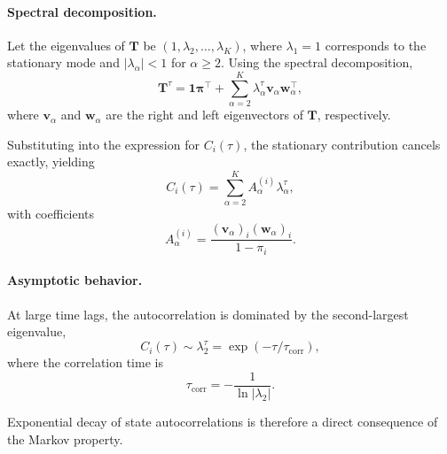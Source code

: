 \documentclass[11pt]{article}
\begin{document}
\paragraph{Spectral decomposition.}
Let the eigenvalues of $\mathbf{T}$ be $(1,\lambda_2,\dots,\lambda_K)$, where
$\lambda_1=1$ corresponds to the stationary mode and
$|\lambda_\alpha|<1$ for $\alpha\ge2$.
Using the spectral decomposition,
\begin{equation}
    \mathbf{T}^\tau
    =
    \mathbf{1}\boldsymbol{\pi}^\top
    + \sum_{\alpha=2}^K \lambda_\alpha^\tau
    \mathbf{v}_\alpha \mathbf{w}_\alpha^\top,
\end{equation}
where $\mathbf{v}_\alpha$ and $\mathbf{w}_\alpha$ are the right and left
eigenvectors of $\mathbf{T}$, respectively.

Substituting into the expression for $C_i(\tau)$, the stationary contribution
cancels exactly, yielding
\begin{equation}
    C_i(\tau)
    =
    \sum_{\alpha=2}^K
    A_\alpha^{(i)} \lambda_\alpha^\tau,
\end{equation}
with coefficients
\begin{equation}
    A_\alpha^{(i)}
    =
    \frac{
        (\mathbf{v}_\alpha)_i (\mathbf{w}_\alpha)_i
    }{
        1-\pi_i
    }.
\end{equation}

\paragraph{Asymptotic behavior.}
At large time lags, the autocorrelation is dominated by the second-largest
eigenvalue,
\begin{equation}
    C_i(\tau) \sim \lambda_2^\tau
    =
    \exp\!\left(-\tau / \tau_{\mathrm{corr}}\right),
\end{equation}
where the correlation time is
\begin{equation}
    \tau_{\mathrm{corr}} = -\frac{1}{\ln|\lambda_2|}.
\end{equation}

Exponential decay of state autocorrelations is therefore a direct consequence
of the Markov property.
\end{document}
